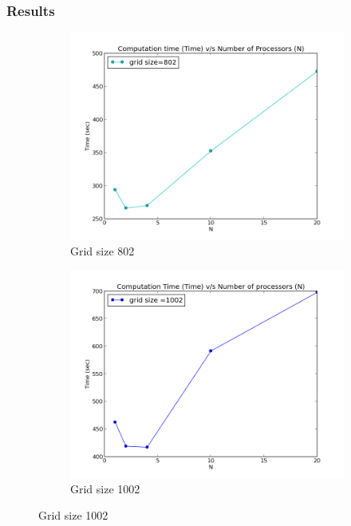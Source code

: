 \documentclass{beamer}
\begin{document}
\begin{frame}
\frametitle{Results}
\begin{figure}
\centering 
\begin{subfigure}{0.49\textwidth}
\includegraphics[width=\textwidth]{802}
\caption{Grid size 802}
\end{subfigure}
\begin{subfigure}{0.49\textwidth}
\includegraphics[width=\textwidth]{1002}
\caption{Grid size 1002}
\end{subfigure}
\end{figure}
\end{frame}


\end{document}
